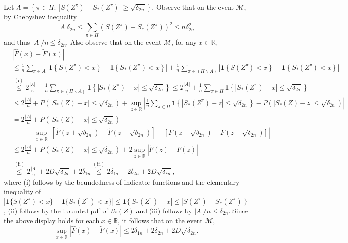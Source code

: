 \documentclass[final,12pt]{colt2018} %
\begin{document}
Let $A=\left\{ \pi\in\Pi:\ |S(Z^\pi)-S_*(Z^\pi)|\geq\sqrt{\delta_{2n}}\right\} $.
Observe that on the event $\mathcal{M}$, by Chebyshev inequality
\[
|A|\delta_{2n}\leq\sum_{\pi\in\Pi}\left(S(Z^\pi)-S_*(Z^\pi)\right)^{2}\leq n\delta_{2n}^{2}
\]
and thus $|A|/n\leq\delta_{2n}$. Also observe that on the event $\mathcal{M}$,
for any $x\in\mathbb{R}$, 
\begin{align}
 & \left|\hat{F}(x)-\tilde{F}(x)\right| \nonumber \\
 & \leq\frac{1}{n}\sum_{\pi\in A}\left|\mathbf{1}\left\{ S(Z^\pi)< x\right\} -\mathbf{1}\left\{ S_*(Z^\pi)< x \right\} \right|+\frac{1}{n}\sum_{\pi\in(\Pi\backslash A)}\left|\mathbf{1}\left\{ S(Z^\pi)< x\right\} -\mathbf{1}\left\{ S_*(Z^\pi)< x\right\} \right|\nonumber \\
 & \overset{\mathrm{(i)}}{\leq}2\frac{|A|}{n}+\frac{1}{n}\sum_{\pi\in(\Pi\backslash A)}\mathbf{1}\left\{ \left|S_*(Z^\pi)-x\right|\leq\sqrt{\delta_{2n}}\right\}  \leq2\frac{|A|}{n}+\frac{1}{n}\sum_{\pi\in\Pi}\mathbf{1}\left\{ \left|S_*(Z^\pi)-x\right|\leq\sqrt{\delta_{2n}}\right\} \nonumber \\
 & \leq2\frac{|A|}{n}+P\left(\left|S_*(Z)-x\right|\leq\sqrt{\delta_{2n}}\right)+\sup_{z\in\mathbb{R}}\left|\frac{1}{n}\sum_{\pi\in\Pi}\mathbf{1}\left\{ \left|S_*(Z^\pi)-z\right|\leq\sqrt{\delta_{2n}}\right\} -P\left(\left|S_*(Z)-z\right|\leq\sqrt{\delta_{2n}}\right)\right| \nonumber \\
 & =2\frac{|A|}{n}+P\left(\left|S_*(Z)-x\right|\leq\sqrt{\delta_{2n}}\right) \nonumber \\
 & \qquad+\sup_{x\in\mathbb{R}}\left|\left[\tilde{F}\left(z+\sqrt{\delta_{2n}}\right)-\tilde{F}\left(z-\sqrt{\delta_{2n}}\right)\right]-\left[F\left(z+\sqrt{\delta_{2n}}\right)-F\left(z-\sqrt{\delta_{2n}}\right)\right]\right| \nonumber \\
 & \leq2\frac{|A|}{n}+P\left(\left|S_*(Z)-x\right|\leq\sqrt{\delta_{2n}}\right)+2\sup_{z\in\mathbb{R}}\left|\tilde{F}(z)-F\left(z\right)\right|\nonumber  \\
 & \overset{\mathrm{(ii)}}{\leq}2\frac{|A|}{n}+2D\sqrt{\delta_{2n}}+2\delta_{1n} \overset{\mathrm{(iii)}}{\leq }2\delta_{1n}+ 2 \delta_{2n}+ 2 D\sqrt{\delta_{2n}}, \label{eq: bound ecdf error}
\end{align}
where (i) follows by the boundedness of indicator functions and
the elementary inequality of $|\mathbf{1}\{S(Z^\pi)< x\}-\mathbf{1}\{S_*(Z^\pi)<x\}|\leq\mathbf{1}\{|S_*(Z^\pi)-x|\leq|S(Z^\pi)-S_*(Z^\pi)|\}$,
(ii) follows by the bounded pdf of $S_*(Z)$ and (iii) follows by $|A|/n\leq\delta_{2n}$.
Since the above display holds for each $x\in\mathbb{R}$, it follows
that on the event $\mathcal{M}$, 
\begin{equation}
\sup_{x\in\mathbb{R}}\left|\hat{F}(x)-\tilde{F}(x)\right|\leq
2\delta_{1n}+ 2 \delta_{2n}+ 2D\sqrt{\delta_{2n}}.\label{eq: thm high level eq 2}
\end{equation}
\end{document}
